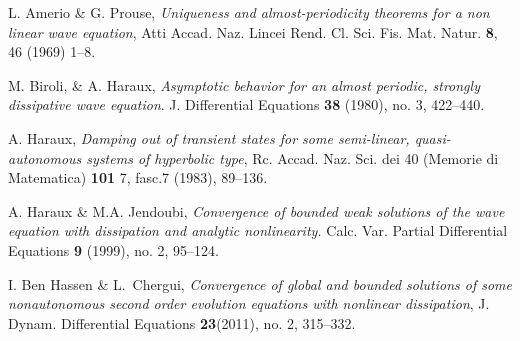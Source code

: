 \documentclass[10pt,a4paper]{article}
\begin{document}
\begin{thebibliography}{7}
 L. Amerio \& G. Prouse, \emph{Uniqueness and almost-periodicity theorems for a non linear wave equation}, Atti Accad. Naz. Lincei Rend. Cl. Sci. Fis. Mat. Natur. \textbf{8}, 46 (1969) 1--8.

 M. Biroli, \& A. Haraux, \emph{Asymptotic behavior for an almost periodic, strongly dissipative wave equation}. J. Differential Equations \textbf{38}  (1980), no. 3, 422--440.

A. Haraux, \emph{Damping out of transient states for some semi-linear, quasi-autonomous systems
of hyperbolic type}, Rc. Accad. Naz. Sci. dei 40 (Memorie di Matematica)  \textbf{101} 7, fasc.7 (1983), 89--136.

A. Haraux \& M.A. Jendoubi, \emph{Convergence of bounded weak solutions of the wave equation with dissipation and analytic nonlinearity.}
Calc. Var. Partial Differential Equations \textbf{9} (1999), no. 2, 95--124.

I. Ben Hassen \& L.~Chergui, \emph{Convergence of global and bounded solutions of some nonautonomous second order evolution equations with nonlinear dissipation},  J. Dynam. Differential Equations \textbf{23}(2011), no. 2, 315--332.


\end{thebibliography}
\end{document}
